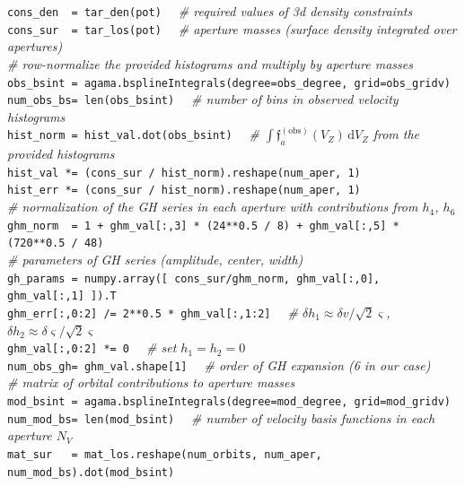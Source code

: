 \documentclass[12pt]{article}
\renewcommand{\d}{\mathrm{d}}
\begin{document}
\texttt{cons_den~~= tar_den(pot)}
\textit{\color{Sepia} \ \ \# required values of 3d density constraints}\\
\texttt{cons_sur~~= tar_los(pot)}
\textit{\color{Sepia} \ \ \# aperture masses (surface density integrated over apertures)}\\[1mm]
\textit{\color{Sepia}\# row-normalize the provided histograms and multiply by aperture masses}\\
\texttt{obs_bsint~= agama.bsplineIntegrals(degree=obs_degree, grid=obs_gridv)}\\
\texttt{num_obs_bs= len(obs_bsint)}
\textit{\color{Sepia}\ \ \# number of bins in observed velocity histograms}\\
\texttt{hist_norm~= hist_val.dot(obs_bsint)}
\textit{\color{Sepia} \ \ \# $\int \mathfrak f_a^\mathrm{(obs)}(V_Z)\, \d V_Z$ from the provided histograms}\\
\texttt{hist_val *= (cons_sur / hist_norm).reshape(num_aper, 1)}\\
\texttt{hist_err *= (cons_sur / hist_norm).reshape(num_aper, 1)}\\[1mm]
\textit{\color{Sepia}\# normalization of the GH series in each aperture with contributions from $h_4$, $h_6$}\\
\texttt{ghm_norm~~= 1 + ghm_val[:,3] * (24**0.5 / 8) + ghm_val[:,5] * (720**0.5 / 48)}\\
\textit{\color{Sepia}\# parameters of GH series (amplitude, center, width)}\\
\texttt{gh_params~= numpy.array([ cons_sur/ghm_norm, ghm_val[:,0], ghm_val[:,1] ]).T}\\
\texttt{ghm_err[:,0:2] /= 2**0.5 * ghm_val[:,1:2]}
\textit{\color{Sepia}\ \ \# $\delta h_1 \approx \delta v / \sqrt{2}\varsigma$, $\delta h_2 \approx \delta \varsigma / \sqrt{2}\varsigma$}\\
\texttt{ghm_val[:,0:2] *= 0} \textit{\color{Sepia}\ \ \# set $h_1=h_2=0$}\\
\texttt{num_obs_gh= ghm_val.shape[1]} 
\textit{\color{Sepia}\ \ \# order of GH expansion (6 in our case)}\\[1mm]
\textit{\color{Sepia}\# matrix of orbital contributions to aperture masses}\\
\texttt{mod_bsint = agama.bsplineIntegrals(degree=mod_degree, grid=mod_gridv)}\\
\texttt{num_mod_bs= len(mod_bsint)}
\textit{\color{Sepia}\ \ \# number of velocity basis functions in each aperture $N_V$}\\
\texttt{mat_sur~~~= mat_los.reshape(num_orbits, num_aper, num_mod_bs).dot(mod_bsint)}\\[2mm]
\end{document}
